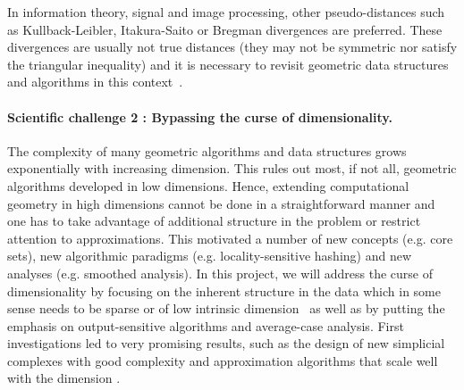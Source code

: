 In information theory, signal and image processing, other pseudo-distances such as Kullback-Leibler, Itakura-Saito or Bregman divergences are preferred.  
These divergences are usually not true distances (they may not be symmetric nor satisfy the triangular inequality) and it is necessary to revisit geometric data structures and algorithms in this context~\cite{geometrica-6154a}.




\paragraph{Scientific challenge 2 :  Bypassing the curse of dimensionality.} 

The complexity of many geometric algorithms and data structures grows exponentially with increasing dimension. %
This rules out most, if not all, geometric algorithms developed in low dimensions.  Hence, extending computational geometry in high dimensions cannot be done in a straightforward manner and one has to take advantage of additional structure in the problem or  restrict attention to approximations. This motivated a number of new concepts (e.g. core sets), new algorithmic paradigms (e.g. locality-sensitive hashing) and new analyses (e.g. smoothed analysis).  In this project, we will address the curse of dimensionality by focusing on the inherent structure in the data which in some sense needs to be sparse or of low intrinsic dimension~\cite{sl-mwp-2000} as well as by putting the emphasis on output-sensitive algorithms and average-case analysis.  
First investigations led to very promising results, such as the design of new simplicial complexes with good complexity and approximation algorithms that scale well with the dimension \cite{geometrica-7142i,cds-tewc-2004}.







